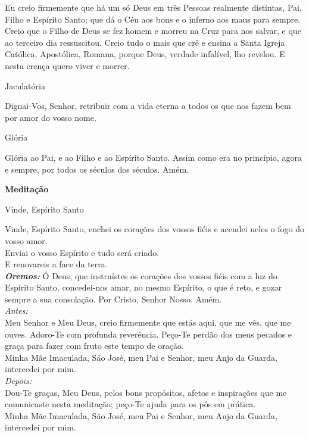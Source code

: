 \documentclass{book}
\begin{document}
\begin{flushleft}
    Eu creio firmemente que há um só Deus em três Pessoas realmente distintas, Pai, Filho e Espírito Santo; que dá o Céu aos bons e o inferno aos maus para sempre. Creio que o Filho de Deus se fez homem e morreu na Cruz para nos salvar, e que ao terceiro dia ressuscitou. Creio tudo o mais que crê e ensina a Santa Igreja Católica, Apostólica, Romana, porque Deus, verdade infalível, lho revelou. E nesta crença quero viver e morrer.
\end{flushleft}
\begin{center}
    Jaculatória
\end{center}
\begin{flushleft}
    Dignai-Vos, Senhor, retribuir com a vida eterna a todos os que nos fazem bem por amor do vosso nome.
\end{flushleft}
\begin{center}
    Glória
\end{center}
\begin{flushleft}
    Glória ao Pai, e ao Filho e ao Espírito Santo. Assim como era no princípio, agora e sempre, por todos os séculos dos séculos. Amém.
\end{flushleft}
\newpage
\begin{center}
    \textbf{Meditação}
\end{center}
\begin{center}
    Vinde, Espírito Santo
\end{center}
\begin{flushleft}
    Vinde, Espírito Santo, enchei os corações dos vossos fiéis e acendei neles o fogo do vosso amor. \\
    \VbarRed{} Enviai o vosso Espírito e tudo será criado. \\
    \RbarRed{} E renovareis a face da terra.
    \vspace{.2cm} \\
    \textbf{\textit{Oremos:}} Ó Deus, que instruístes os corações dos vossos fiéis com a luz do Espírito Santo, concedei-nos amar, no mesmo Espírito, o que é reto, e gozar sempre a sua consolação. Por Cristo, Senhor Nosso. Amém.
    \vspace{.2cm} \\
    \textit{Antes:} \\ Meu Senhor e Meu Deus, creio firmemente que estás aqui, que me vês, que me ouves. Adoro-Te com profunda reverência. Peço-Te perdão dos meus pecados e graça para fazer com fruto este tempo de oração. \\ Minha Mãe Imaculada, São José, meu Pai e Senhor, meu Anjo da Guarda, intercedei por mim.
    \vspace{.2cm} \\
    \textit{Depois:} \\ Dou-Te graças, Meu Deus, pelos bons propósitos, afetos e inspirações que me comunicaste nesta meditação; peço-Te ajuda para os pôs em prática. \\ Minha Mãe Imaculada, São José, meu Pai e Senhor, meu Anjo da Guarda, intercedei por mim.
\end{flushleft}
\end{document}
